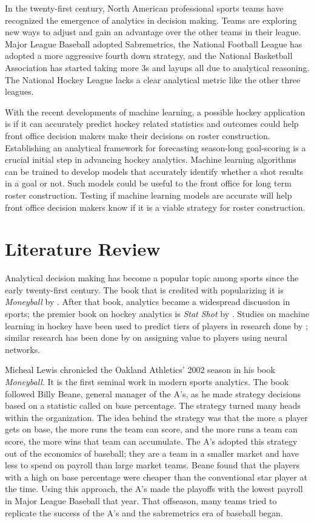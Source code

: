 \documentclass[12pt,english]{article}
\begin{document}
In the twenty-first century, North American professional sports teams have recognized the emergence of analytics in decision making. Teams are exploring new ways to adjust and gain an advantage over the other teams in their league. Major League Baseball adopted Sabremetrics, the National Football League has adopted a more aggressive fourth down strategy, and the National Basketball Association has started taking more 3s and layups all due to analytical reasoning. The National Hockey League lacks a clear analytical metric like the other three leagues. 

With the recent developments of machine learning, a possible hockey application is if it can accurately predict hockey related statistics and outcomes could help front office decision makers make their decisions on roster construction. Establishing an analytical framework for forecasting season-long goal-scoring is a crucial initial step in advancing hockey analytics. Machine learning algorithms can be trained to develop models that accurately identify whether a shot results in a goal or not. Such models could be useful to the front office for long term roster construction. Testing if machine learning models are accurate will help front office decision makers know if it is a viable strategy for roster construction. 

\section{Literature Review}\label{sec:litreview}

Analytical decision making has become a popular topic among sports since the early twenty-first century. The book that is credited with popularizing it is \textit{Moneyball} by \citet{moneyball}. After that book, analytics became a widespread discussion in sports; the premier book on hockey analytics is \textit{Stat Shot} by \citet{statshot}. Studies on machine learning in hockey have been used to predict tiers of players in research done by \citet{lehmus}; similar research has been done by \citet{Liu} on assigning value to players using neural networks. 


Micheal Lewis chronicled the Oakland Athletics' 2002 season in his book \textit{Moneyball}. It is the first seminal work in modern sports analytics. The book followed Billy Beane, general manager of the A's, as he made strategy decisions based on a statistic called on base percentage. The strategy turned many heads within the organization. The idea behind the strategy was that the more a player gets on base, the more runs the team can score, and the more runs a team can score, the more wins that team can accumulate. The A's adopted this strategy out of the economics of baseball; they are a team in a smaller market and have less to spend on payroll than large market teams. Beane found that the players with a high on base percentage were cheaper than the conventional star player at the time. Using this approach, the A's made the playoffs with the lowest payroll in Major League Baseball that year. That offseason, many teams tried to replicate the success of the A's and the sabremetrics era of baseball began. 
\end{document}
